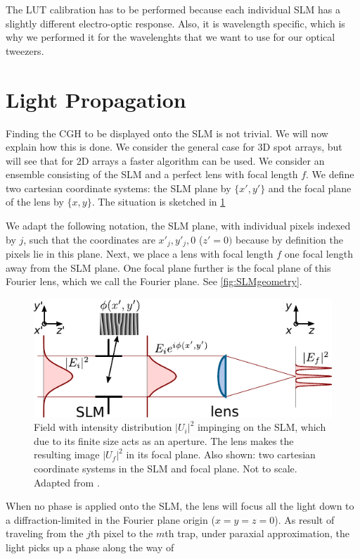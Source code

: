 The LUT calibration has to be performed because each individual SLM has a slightly different electro-optic response. 
Also, it is wavelength specific, which is why we performed it for the wavelenghts that we want to use for our optical tweezers. 

\section{Light Propagation}\label{sec:PropagationDerivation}

Finding the \ac{CGH} to be displayed onto the SLM is not trivial. We will now explain how this is done.
We consider the general case for 3D spot arrays, but will see that for 2D arrays a faster algorithm can be used. 
We consider an ensemble consisting of the SLM and a perfect lens with focal length $f$. We define two cartesian coordinate systems: the SLM plane by $\{x',y'\}$ and the focal plane of the lens by $\{x,y\}$. 
The situation is sketched in \cref{fig:SLMLens}

We adapt the following notation, the \ac{SLM} plane, with individual pixels indexed by $j$, such that the coordinates are $x'_j, y'_j,0$ ($z'=0)$ because by definition the pixels lie in this plane.
Next, we place a lens with focal length $f$ one focal length away from the SLM plane.
One focal plane further is the focal plane of this Fourier lens, which we call the Fourier plane. See \cref{fig:SLMgeometry}. 

\begin{figure}
    \centering
    \includegraphics[width = 12cm]{figures/SLMfigure.pdf}
    \caption{Field with intensity distribution $|U_i|^2$ impinging on the SLM, which due to its finite size acts as an aperture.
    The lens makes the resulting image $|U_f|^2$ in its focal plane.
    Also shown: two cartesian coordinate systems in the SLM and focal plane. 
    Not to scale. 
    Adapted from \cite{Labuhn2016}.}
    \label{fig:SLMLens}
\end{figure}

When no phase is applied onto the SLM, the lens will focus all the light down to a diffraction-limited in the Fourier plane origin ($x=y=z=0$).
As result of traveling from the $j$th pixel to the $m$th trap, under paraxial approximation, the light picks up a phase along the way of 

